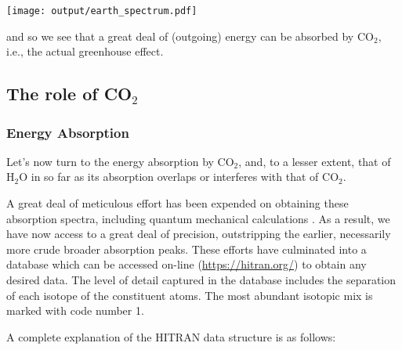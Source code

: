 \documentclass[10pt,a4paper,titlepage]{article}
\begin{document}
\texttt{[image: output/earth\_spectrum.pdf]}

and so we see that a great deal of (outgoing) energy can be absorbed
by CO$_{\text{2}}$, i.e., the actual greenhouse effect.

\subsection{The role of CO$_{\text{2}}$}
\label{sec-3-4}
\subsubsection{Energy Absorption}
\label{sec-3-4-1}
Let's now turn to the energy absorption by CO$_{\text{2}}$, and, to a lesser
extent, that of H$_{\text{2}}$O in so far as its absorption overlaps or
interferes with that of CO$_{\text{2}}$.

A great deal of meticulous effort has been expended on obtaining these
absorption spectra, including quantum mechanical calculations
\citep{rothman-al2009:hitran,lamouroux-al12:database,etminan-al16:forcing,mlynczak-al16:spectroscopic}. As
a result, we have now access to a great deal of precision,
outstripping the earlier, necessarily more crude broader absorption
peaks.  These efforts have culminated into a database which can be
accessed on-line (\url{https://hitran.org/}) to obtain any desired data.
The level of detail captured in the database includes the separation
of each isotope of the constituent atoms. The most abundant isotopic
mix is marked with code number 1.

A complete explanation of the  HITRAN data structure is as follows:
\end{document}
